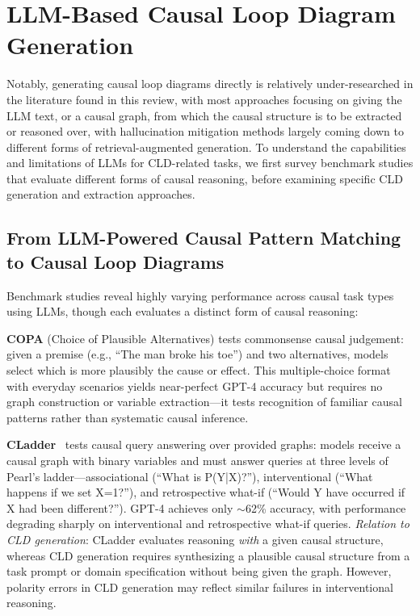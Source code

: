 
\section{LLM-Based Causal Loop Diagram Generation}
\label{sec:lit_cld_generation}

Notably, generating causal loop diagrams directly is relatively under-researched in the literature found in this review, with most approaches focusing on giving the LLM text, or a causal graph, from which the causal structure is to be extracted or reasoned over, with hallucination mitigation methods largely coming down to different forms of retrieval-augmented generation. To understand the capabilities and limitations of LLMs for CLD-related tasks, we first survey benchmark studies that evaluate different forms of causal reasoning, before examining specific CLD generation and extraction approaches.

\subsection{From LLM-Powered Causal Pattern Matching to Causal Loop Diagrams}

Benchmark studies reveal highly varying performance across causal task types using LLMs, though each evaluates a distinct form of causal reasoning:

\textbf{COPA} (Choice of Plausible Alternatives) tests commonsense causal judgement: given a premise (e.g., ``The man broke his toe'') and two alternatives, models select which is more plausibly the cause or effect. This multiple-choice format with everyday scenarios yields near-perfect GPT-4 accuracy but requires no graph construction or variable extraction---it tests recognition of familiar causal patterns rather than systematic causal inference.

\textbf{CLadder}~\citep{jin2023cladder} tests causal query answering over provided graphs: models receive a causal graph with binary variables and must answer queries at three levels of Pearl's ladder---associational (``What is P(Y|X)?''), interventional (``What happens if we set X=1?''), and retrospective what-if (``Would Y have occurred if X had been different?''). GPT-4 achieves only $\sim$62\% accuracy, with performance degrading sharply on interventional and retrospective what-if queries. \textit{Relation to CLD generation}: CLadder evaluates reasoning \textit{with} a given causal structure, whereas CLD generation requires synthesizing a plausible causal structure from a task prompt or domain specification without being given the graph. However, polarity errors in CLD generation may reflect similar failures in interventional reasoning.


